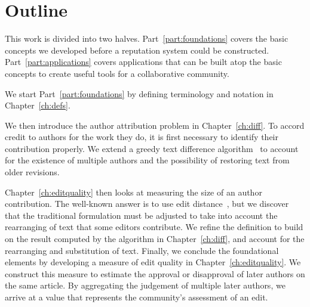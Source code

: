 \section{Outline}

This work is divided into two halves.
Part~\ref{part:foundations} covers the basic concepts we developed
before a reputation system could be constructed.
Part~\ref{part:applications} covers applications that can
be built atop the basic concepts to create useful tools for
a collaborative community.

We start Part~\ref{part:foundations}
by defining terminology and notation in Chapter~\ref{ch:defs}.

We then introduce the author attribution problem in Chapter~\ref{ch:diff}.
To accord credit to authors for the work they do,
it is first necessary to identify their contribution properly.
We extend a greedy text difference algorithm~\cite{Reichenberger1991,Burns1997} to
account for the existence of multiple authors and the possibility
of restoring text from older revisions.

Chapter~\ref{ch:editquality} then looks at measuring the size of
an author contribution.
The well-known answer is to use edit distance~\cite{Levenshtein1966},
but we discover that the traditional formulation must be adjusted
to take into account the rearranging of text that some editors contribute.
We refine the definition to build on the result computed by the
algorithm in Chapter~\ref{ch:diff}, and account for the rearranging
and substitution of text.
Finally, we conclude the foundational elements by developing a measure
of edit quality in Chapter~\ref{ch:editquality}.
We construct this measure to estimate the approval or disapproval of
later authors on the same article.
By aggregating the judgement of multiple later authors, we arrive at
a value that represents the community's assessment of an edit.


